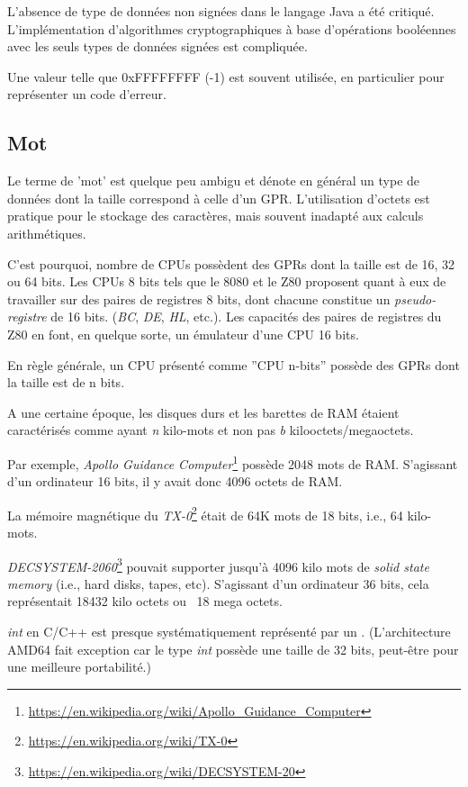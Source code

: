 L'absence de type de données non signées dans le langage Java a été critiqué.
L'implémentation d'algorithmes cryptographiques à base d'opérations booléennes avec les seuls types de données signées est compliquée.

Une valeur telle que 0xFFFFFFFF (-1) est souvent utilisée, en particulier pour représenter un code d'erreur.

\subsection{Mot}

 Le terme de 'mot' est quelque peu ambigu et dénote en général un type de données dont la taille correspond à celle d'un \ac{GPR}.
L'utilisation d'octets est pratique pour le stockage des caractères, mais souvent inadapté aux calculs arithmétiques.

C'est pourquoi, nombre de \ac{CPU}s possèdent des \ac{GPR}s dont la taille est de 16, 32 ou 64 bits.
Les CPUs 8 bits tels que le 8080 et le Z80 proposent quant à eux de travailler sur des paires de registres 8 bits, dont chacune constitue un \emph{pseudo-registre} de 16 bits.
(\emph{BC}, \emph{DE}, \emph{HL}, etc.).
Les capacités des paires de registres du Z80 en font, en quelque sorte, un émulateur d'une CPU 16 bits.

En règle générale, un CPU présenté comme ''CPU n-bits'' possède des \ac{GPR}s dont la taille est de n bits.

A une certaine époque, les disques durs et les barettes de \ac{RAM} étaient caractérisés comme ayant \emph{n} kilo-mots
et non pas \emph{b} kilooctets/megaoctets.

Par exemple, \emph{Apollo Guidance Computer}\footnote{\url{https://en.wikipedia.org/wiki/Apollo_Guidance_Computer}}
possède 2048 mots de \ac{RAM}.
S'agissant d'un ordinateur 16 bits, il y avait donc 4096 octets de \ac{RAM}.

La mémoire magnétique du \emph{TX-0}\footnote{\url{https://en.wikipedia.org/wiki/TX-0}} était de 64K mots de 18 bits,
i.e., 64 kilo-mots.

\emph{DECSYSTEM-2060}\footnote{\url{https://en.wikipedia.org/wiki/DECSYSTEM-20}}
pouvait supporter jusqu'à 4096 kilo mots de \emph{solid state memory}
(i.e., hard disks, tapes, etc).
S'agissant d'un ordinateur 36 bits, cela représentait 18432 kilo octets ou ~18 mega octets.

\myhrule{}

\emph{int} en C/C++ est presque systématiquement représenté par un .
(L'architecture AMD64 fait exception car le type \emph{int} possède une taille de 32 bits, peut-être pour une meilleure portabilité.)


